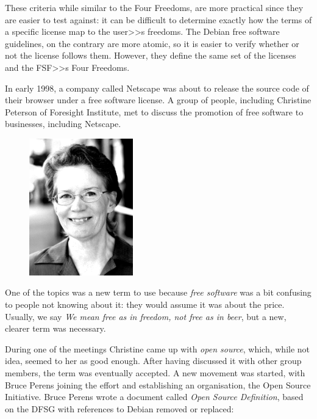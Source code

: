 \documentclass[10pt, a5paper]{article}
\begin{document}
These criteria while similar to the Four Freedoms, are more practical since they are easier to test against: it can be difficult to determine exactly how the terms of a specific license map to the user>>s freedoms. The Debian free software guidelines, on the contrary are more atomic, so it is easier to verify whether or not the license follows them. However, they define the same set of the licenses and the FSF>>s Four Freedoms.

In early 1998, a company called Netscape was about to release the source code of their browser under a free software license. A group of people, including Christine Peterson of Foresight Institute, met to discuss the promotion of free software to businesses, including Netscape.

\begin{center}
\begin{figure}[h!]
  \centering
  \includegraphics[width=4.5cm]{14_2019_Shadura5.jpg}
  
  \label{fig5}
\end{figure}
\end{center}

One of the topics was a new term to use because \emph{free software} was a bit confusing to people not knowing about it: they would assume it was about the price. Usually, we say \emph{We mean free as in freedom, not free as in beer}, but a new, clearer term was necessary.

During one of the meetings Christine came up with \emph{open source}, which, while not idea, seemed to her as good enough. After having discussed it with other group members, the term was eventually accepted. A new movement was started, with Bruce Perens joining the effort and establishing an organisation, the Open Source Initiative. Bruce Perens wrote a document called \emph{Open Source Definition}, based on the DFSG with references to Debian removed or replaced:
\end{document}
